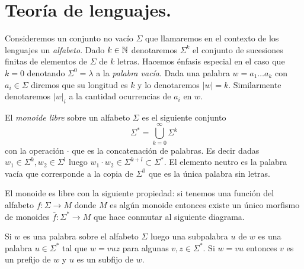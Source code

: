 \documentclass[tesis.tex]{subfiles}
\begin{document}
\section{Teoría de lenguajes.}	

Consideremos un conjunto no vacío $\Sigma$ que llamaremos en el contexto de los lenguajes un \emph{alfabeto}. 
Dado $k \in \mathbb{N}$ denotaremos $\Sigma^k$ el conjunto de sucesiones finitas de elementos de $\Sigma$ de $k$ letras.
Hacemos énfasis especial en el caso que $k=0$ denotando $\Sigma^0 = \lambda$ a la \emph{palabra vacía}.
Dada una palabra $w= a_1 \dots a_k$ con  $a_i \in \Sigma$ diremos que su longitud es $k$ y lo denotaremos $|w| = k$. 
Similarmente denotaremos $|w|_{i}$ a la cantidad ocurrencias de $a_{i}$ en $w$.



\begin{deff}
	El \emph{monoide libre} sobre un alfabeto $\Sigma$ es el siguiente conjunto
	\begin{equation*}
		\Sigma^{*} = \bigcup_{k=0}^{\infty} \Sigma^k
	\end{equation*}
	con la operación $\cdot$ que es la concatenación de palabras. 
	Es decir dadas $w_1 \in \Sigma^{k}, w_2 \in \Sigma^{l}$ luego $w_1 \cdot w_2 \in \Sigma^{k+l} \subset \Sigma^*$. El elemento neutro es la palabra vacía que corresponde a la copia de $\Sigma^0$ que es la única palabra sin letras. 
\end{deff}
\begin{obs}
	El monoide es libre con la siguiente propiedad: si tenemos una función del alfabeto $f: \Sigma \to M$ donde $M$ es algún monoide entonces existe un único morfismo de monoides $\overline f: \Sigma^{*} \to M$ que hace conmutar al siguiente diagrama.	
	
	\begin{center}
	\end{center}
	
\end{obs}

Si $w$ es una palabra sobre el alfabeto $\Sigma$ luego una subpalabra $u$ de $w$ es una palabra $u \in \Sigma^*$ tal que $w = vuz$ para algunas $v, z \in \Sigma^*$. Si $w = vu$ entonces $v$ es un prefijo de $w$ y $u$ es un subfijo de $w$.
\end{document}
